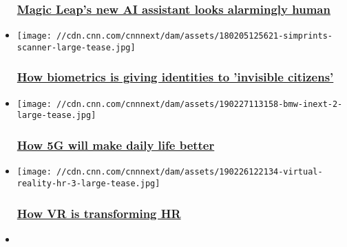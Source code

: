 \begin{itemize}
  \hypertarget{magic-leaps-new-ai-assistant-looks-alarmingly-human}{%
  \subsubsection{\texorpdfstring{\href{/2018/10/12/tech/magic-leap-ai-assistant/index.html}{Magic
  Leap's new AI assistant looks alarmingly
  human}}{Magic Leap's new AI assistant looks alarmingly human}}\label{magic-leaps-new-ai-assistant-looks-alarmingly-human}}
\item
  \href{/2018/02/18/health/biometrics-simprints-fingerprints/index.html}{}

  \texttt{[image: //cdn.cnn.com/cnnnext/dam/assets/180205125621-simprints-scanner-large-tease.jpg]}

  \hypertarget{how-biometrics-is-giving-identities-to-invisible-citizens}{%
  \subsubsection{\texorpdfstring{\href{/2018/02/18/health/biometrics-simprints-fingerprints/index.html}{How
  biometrics is giving identities to 'invisible
  citizens'}}{How biometrics is giving identities to 'invisible citizens'}}\label{how-biometrics-is-giving-identities-to-invisible-citizens}}
\item
  \href{/2019/02/28/tech/5g-benefits-mobile-world-congress/index.html}{}

  \texttt{[image: //cdn.cnn.com/cnnnext/dam/assets/190227113158-bmw-inext-2-large-tease.jpg]}

  \hypertarget{how-5g-will-make-daily-life-better-}{%
  \subsubsection{\texorpdfstring{\href{/2019/02/28/tech/5g-benefits-mobile-world-congress/index.html}{How
  5G will make daily life better
  }}{How 5G will make daily life better }}\label{how-5g-will-make-daily-life-better-}}
\item
  \href{/2019/02/26/tech/vr-transforming-hr-intl-biz-evolved/index.html}{}

  \texttt{[image: //cdn.cnn.com/cnnnext/dam/assets/190226122134-virtual-reality-hr-3-large-tease.jpg]}

  \hypertarget{how-vr-is-transforming-hr}{%
  \subsubsection{\texorpdfstring{\href{/2019/02/26/tech/vr-transforming-hr-intl-biz-evolved/index.html}{How
  VR is transforming
  HR}}{How VR is transforming HR}}\label{how-vr-is-transforming-hr}}
\item
  \href{/2019/08/23/business/tribe-wearable-tech/index.html}{}


\end{itemize}
